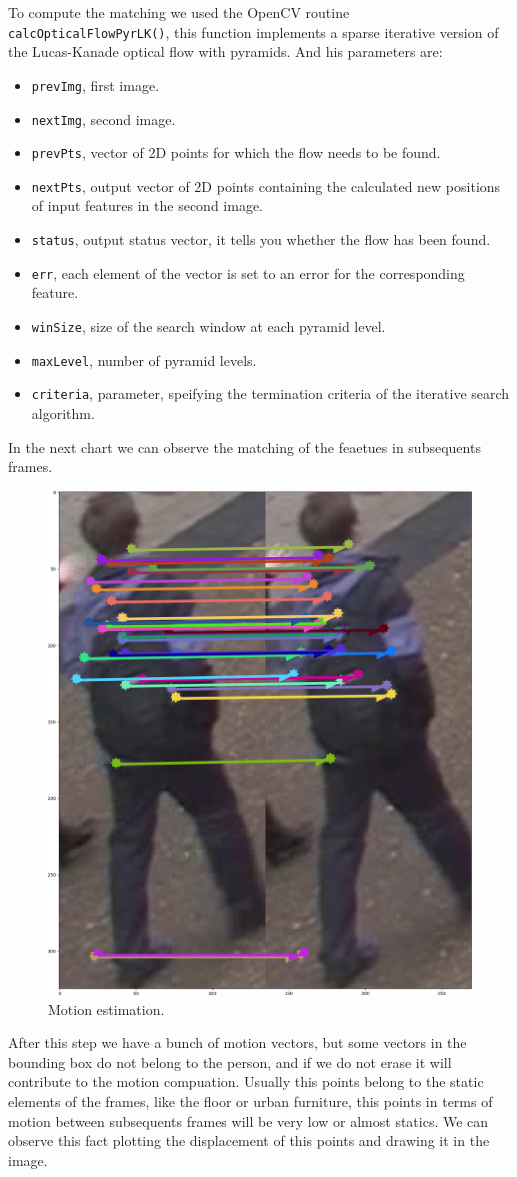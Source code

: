 \documentclass[12pt, a4paper, titlepage,twoside,openright]{article}
\begin{document}
To compute the matching we used the OpenCV routine \texttt{calcOpticalFlowPyrLK()}, this function implements a sparse iterative version of the Lucas-Kanade optical flow with pyramids. And his parameters are:
 
\begin{itemize}

\item \texttt{prevImg}, first image.
\item \texttt{nextImg}, second image.
\item \texttt{prevPts}, vector of 2D points for which the flow needs to be found. 
\item \texttt{nextPts}, output vector of 2D points containing the calculated new positions of input features in the second image. 
\item \texttt{status}, output status vector, it tells you whether the flow has been found.  
\item \texttt{err}, each element of the vector is set to an error for the corresponding feature.
\item \texttt{winSize}, size of the search window at each pyramid level. 
\item \texttt{maxLevel}, number of pyramid levels.  
\item \texttt{criteria}, parameter, speifying the termination criteria of the iterative search algorithm.
\end{itemize}


In the next chart we can observe the matching of the feaetues in subsequents frames.

\begin{figure}[hptb]
\centering         
\includegraphics[width=0.3\linewidth]{implementation/matching.png}
\caption{Motion estimation.} \label{motion1}
\end{figure}


After this step we have a bunch of motion vectors, but some vectors in the bounding box do not belong to the person, and if we do not erase it will contribute to the motion compuation. Usually this points belong to the static elements of the frames, like the floor or urban furniture, this points in terms of motion between subsequents frames will be very low or almost statics. We can observe this fact plotting the displacement of this points and drawing it in the image.
\end{document}
